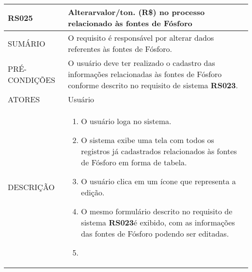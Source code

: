 \begin{longtable}[c]{@{}|p{4cm}|p{9cm}|@{}}
\hline
\begin{minipage}[t]{0.47\columnwidth}
\textbf{RS025}
\end{minipage} & \begin{minipage}[t]{0.47\columnwidth}
Alterarvalor/ton. (R\$) no processo relacionado às fontes de Fósforo
\end{minipage}
\\\hline
\begin{minipage}[t]{0.47\columnwidth}
SUMÁRIO
\end{minipage} & \begin{minipage}[t]{0.47\columnwidth}
O requisito é responsável por alterar dados referentes às fontes de
Fósforo.
\end{minipage}
\\\hline
\begin{minipage}[t]{0.47\columnwidth}
PRÉ-CONDIÇÕES
\end{minipage} & \begin{minipage}[t]{0.47\columnwidth}
O usuário deve ter realizado o cadastro das informações relacionadas às
fontes de Fósforo conforme descrito no requisito de sistema \textbf{RS023}.
\end{minipage}
\\\hline
\begin{minipage}[t]{0.47\columnwidth}
ATORES
\end{minipage} & \begin{minipage}[t]{0.47\columnwidth}
Usuário
\end{minipage}
\\\hline
\begin{minipage}[t]{0.47\columnwidth}
DESCRIÇÃO
\end{minipage} & \begin{minipage}[t]{0.47\columnwidth}
\begin{enumerate}
\def\labelenumi{\arabic{enumi}.}
\itemsep1pt\parskip0pt\parsep0pt
\item
  O usuário loga no sistema.
\item
  O sistema exibe uma tela com todos os registros já cadastrados
  relacionados às fontes de Fósforo em forma de tabela.
\item
  O usuário clica em um ícone que representa a edição.
\item
  O mesmo formulário descrito no requisito de sistema \textbf{RS023}é exibido,
  com as informações das fontes de Fósforo podendo ser editadas.
\item

\end{enumerate}
\end{minipage}
\end{longtable}
